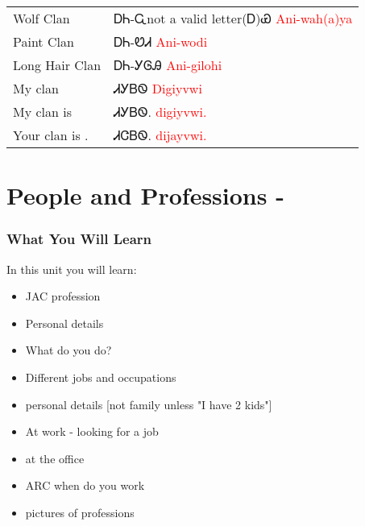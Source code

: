 \begin{multicols}
\vfill\newpage\begin{minipage}{\linewidth}\begin{tabular}{p{5cm} p{9cm}}
Wolf Clan & ᎠᏂ-Ꮹnot a valid letter(Ꭰ)Ꮿ 
 \newline \textcolor{red}{Ani-wah(a)ya}\\
Paint Clan & ᎠᏂ-ᏬᏗ 
 \newline \textcolor{red}{Ani-wodi}\\
Long Hair Clan & ᎠᏂ-ᎩᎶᎯ 
 \newline \textcolor{red}{Ani-gilohi}\\
My clan & ᏗᎩᏴᏫ 
 \newline \textcolor{red}{Digiyvwi}\\
My clan is \underline{    } &  ᏗᎩᏴᏫ. 
 \newline \textcolor{red}{ digiyvwi.}\\
Your clan is \underline{    }. &  ᏗᏣᏴᏫ. 
 \newline \textcolor{red}{ dijayvwi.}\\
\end{tabular}
\end{minipage}

\index{}
\chapter{People and Professions - }
\subsection{What You Will Learn}
In this unit you will learn:
\begin{itemize}
\item JAC profession
\item Personal details
\item What do you do?
\item Different jobs and occupations
\item personal details [not family unless "I have 2 kids"]
\item At work - looking for a job
\item at the office
\item ARC when do you work
\item pictures of professions
\end{itemize}\newpage


\end{multicols}
